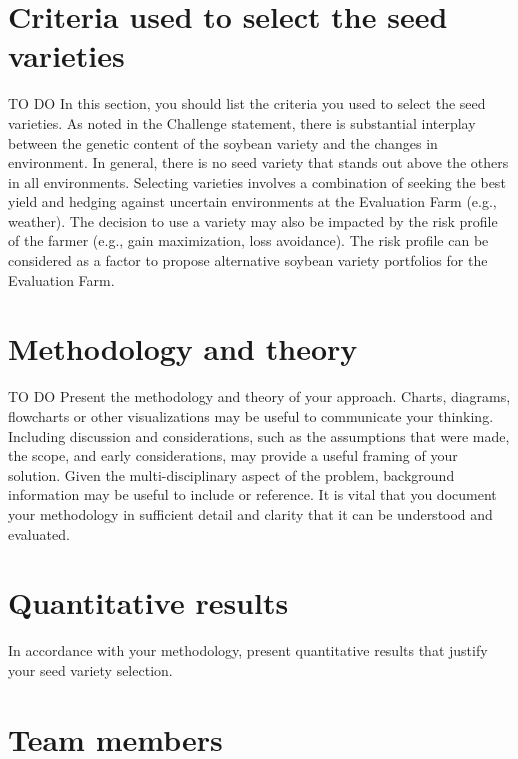 \documentclass[syngen,nonblindrev]{informs3-syngen}
\begin{document}
\section{Criteria used to select the seed varieties}

TO DO  In this section, you should list the criteria you used to select the seed varieties.  As noted in the Challenge statement, there is substantial interplay between the genetic content of the soybean variety and the changes in environment. In general, there is no seed variety that stands out above the others in all environments. Selecting varieties involves a combination of seeking the best yield and hedging against uncertain environments at the Evaluation Farm (e.g., weather).  The decision to use a variety may also be impacted by the risk profile of the farmer (e.g., gain maximization, loss avoidance). The risk profile can be considered as a factor to propose alternative soybean variety portfolios for the Evaluation Farm. 



\section{Methodology and theory}

TO DO  Present the methodology and theory of your approach.  Charts, diagrams, flowcharts or other visualizations may be useful to communicate your thinking. Including discussion and considerations, such as the assumptions that were made, the scope, and early considerations,  may provide a useful framing of your solution.  Given the multi-disciplinary aspect of the problem,  background information may be useful to include or reference.  It is vital that you document your methodology in sufficient detail and clarity that it can be understood and evaluated. 



\section{Quantitative results}

In accordance with your methodology, present quantitative results that justify your seed variety selection.



\section{Team members}
\end{document}
